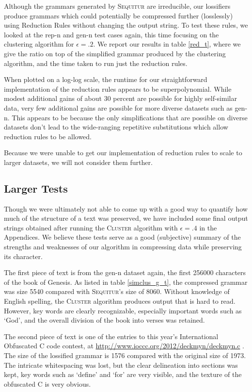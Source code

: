 \documentclass[11pt]{article}
\newcommand{\Sequitur}{\textsc{Sequitur}\xspace}
\newcommand{\Cluster}{\textsc{Cluster}\xspace}
\begin{document}
Although the grammars generated by \Sequitur are irreducible, our lossifiers
produce grammars which could potentially be compressed further (losslessly)
using Reduction Rules without changing the output string. To test these rules,
we looked at the rep-n and gen-n
test cases again, this time focusing on the clustering algorithm for $\epsilon
= .2$. We report our results in table \ref{red_t}, where
we give the ratio on top of the simplified grammar produced by
the clustering algorithm, and the time taken to run just the reduction rules.

When plotted on a log-log scale, the runtime for our straightforward
implementation of the reduction rules appears to be superpolynomial. While
modest additional gains of about 30 percent are possible for highly
self-similar data, very few additional gains are possible for more diverse
datasets such as gen-n. This appears to be because the only simplifications
that are possible on diverse datasets don't lead to the wide-ranging repetitive
substitutions which allow reduction rules to be allowed.

Because we were unable to get our implementation of
reduction rules to scale to larger datasets, we
will not consider them further.

\subsection{Larger Tests}

Though we were ultimately not able to come up with a good way to quantify how
much of the structure of a text was preserved, we have included some final
output strings obtained after running the \Cluster algorithm with $\epsilon
= .4$ in the Appendices. We believe these tests serve as a good (subjective)
summary of the strengths and weaknesses of our algorithm in compressing data
while preserving its character.

The first piece of text is from the gen-n dataset again, the first 256000
characters of the book of Genesis. As listed in table \ref{simclus_g_t}, the
compressed grammar was size 5540 compared with \Sequitur's size of 8060.
Without knowledge of English spelling, the \Cluster algorithm produces output
that is hard to read. However, key words are clearly recognizable, especially
important words such as `God', and the overall division of the book into
verses was retained.

The second piece of text is one of the entries to this year's International
Obfuscated C code contest, at \url{http://www.ioccc.org/2012/deckmyn/deckmyn.c}
.  The size of the lossified grammar is 1576 compared with the original size of
1973. The intricate whitespacing was lost, but the clear delineation into
sections was kept, key words such as `define' and `for' are very visible,
and the texture of the obfuscated C is very obvious.
\end{document}
